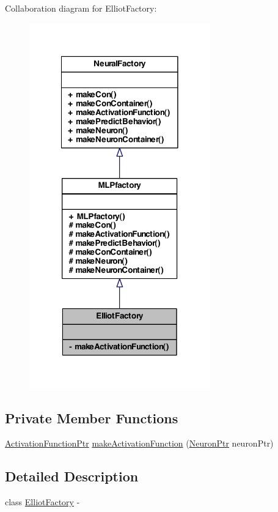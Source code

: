 Collaboration diagram for ElliotFactory:
\nopagebreak
\begin{figure}[H]
\begin{center}
\leavevmode
\includegraphics[width=222pt]{class_elliot_factory__coll__graph}
\end{center}
\end{figure}
\subsection*{Private Member Functions}
\begin{DoxyCompactItemize}
\item 
\hyperlink{_a_m_o_r_e_8h_a77602a0277a02e5769c3df0adc669b17}{ActivationFunctionPtr} \hyperlink{class_elliot_factory_aedc7054f162dea077b2de6beaa7d1577}{makeActivationFunction} (\hyperlink{_a_m_o_r_e_8h_ac1ea936c2c7728eb382278131652fef4}{NeuronPtr} neuronPtr)
\end{DoxyCompactItemize}


\subsection{Detailed Description}
class \hyperlink{class_elliot_factory}{ElliotFactory} -\/ 


